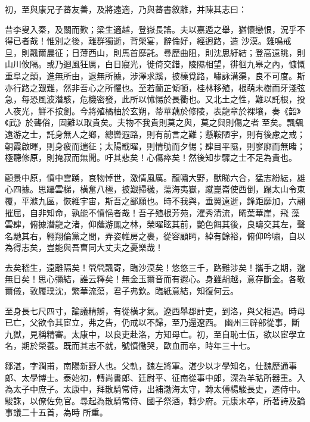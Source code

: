 \begin{pinyinscope}
 初，至與康兄子蕃友善，及將遠適，乃與蕃書敘離，并陳其志曰：



 昔李叟入秦，及關而歎；梁生適越，登嶽長謠。夫以嘉遁之舉，猶懷戀恨，況乎不得已者哉！惟別之後，離群獨逝，背榮宴，辭倫好，經迥路，造
 沙漠。雞鳴戒旦，則飄爾晨征；日薄西山，則馬首靡託。尋歷曲阻，則沈思紆結；登高遠眺，則山川攸隔。或乃迴風狂厲，白日寢光，徙倚交錯，陵隰相望，徘徊九皋之內，慷慨重阜之顛，進無所由，退無所據，涉澤求蹊，披榛覓路，嘯詠溝渠，良不可度。斯亦行路之艱難，然非吾心之所懼也。至若蘭芷傾頓，桂林移殖，根萌未樹而牙淺弦急，每恐風波潛駭，危機密發，此所以怵惕於長衢也。又北土之性，難以託根，投人夜光，鮮不按劍。今將殖橘柚於玄朔，蒂華藕於修陵，表龍章於裸壤，奏《韶》《武》於聾俗，固難以取貴矣。夫物不我貴則莫之與，莫之與則傷之者
 至矣。飄颻遠游之士，託身無人之鄉，總轡遐路，則有前言之難；懸鞍陋宇，則有後慮之戒；朝霞啟暉，則身疲而遄征；太陽戢曜，則情劬而夕惕；肆目平隰，則寥廓而無睹；極聽修原，則掩寂而無聞。吁其悲矣！心傷瘁矣！然後知步驟之士不足為貴也。



 顧景中原，憤中雲踴，哀物悼世，激情風厲。龍嘯大野，獸睇六合，猛志紛紜，雄心四據。思躡雲梯，橫奮八極，披艱掃穢，蕩海夷嶽，蹴崑崙使西倒，蹋太山令東覆，平滌九區，恢維宇宙，斯吾之鄙願也。時不我與，垂翼遠逝，鋒距靡加，六翮摧屈，自非知命，孰能不憤悒者哉！吾子殖根芳苑，濯秀清流，晞葉華崖，飛
 藻雲肆，俯據潛龍之渚，仰蔭游鳳之林，榮曜眩其前，艷色餌其後，良疇交其左，聲名馳其右，翱翔倫黨之間，弄姿帷房之裹，從容顧眄，綽有餘裕，俯仰吟嘯，自以為得志矣，豈能與吾曹同大丈夫之憂樂哉！



 去矣嵇生，遠離隔矣！煢煢飄寄，臨沙漠矣！悠悠三千，路難涉矣！攜手之期，邈無日矣！思心彌結，誰云釋矣！無金玉爾音而有遐心。身雖胡越，意存斷金。各敬爾儀，敦履璞沈，繁華流蕩，君子弗欽。臨紙意結，知復何云。



 至身長七尺四寸，論議精辯，有從橫才氣。遼西舉郡計吏，到洛，與父相遇。時母已亡，父欲令其宦立，弗之告，仍戒以不歸，至乃還遼西。
 幽州三辟部從事，斷九獄，見稱精審。太康中，以良吏赴洛，方知母亡。初，至自恥士伍，欲以宦學立名，期於榮養。既而其志不就，號憤慟哭，歐血而卒，時年三十七。



 鄒湛，字潤甫，南陽新野人也。父軌，魏左將軍。湛少以才學知名，仕魏歷通事郎、太學博士。泰始初，轉尚書郎、廷尉平、征南從事中郎，深為羊祜所器重。入為太子中庶子。太康中，拜散騎常侍，出補渤海太守，轉太傅楊駿長史，遷侍中。駿誅，以僚佐免官。尋起為散騎常侍、國子祭酒，轉少府。元康末卒，所著詩及論事議二十五首，為時
 所重。




\end{pinyinscope}
